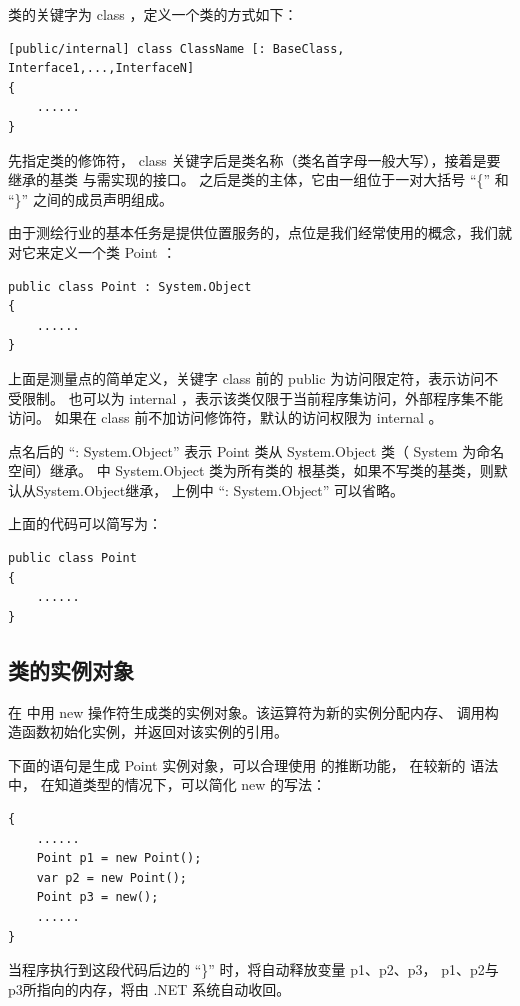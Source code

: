 类的关键字为 class ，定义一个类的方式如下：

\begin{lstlisting}[numbers=none]
[public/internal] class ClassName [: BaseClass, Interface1,...,InterfaceN]
{
    ......
}
\end{lstlisting}

先指定类的修饰符， class 关键字后是类名称（类名首字母一般大写），接着是要继承的基类
与需实现的接口。
之后是类的主体，它由一组位于一对大括号 ``\{'' 和 ``\}'' 之间的成员声明组成。

由于测绘行业的基本任务是提供位置服务的，点位是我们经常使用的概念，我们就对它来定义一个类 Point ：

\begin{lstlisting}[numbers=none]
public class Point : System.Object
{
    ......
}
\end{lstlisting}

上面是测量点的简单定义，关键字 class 前的 public 为访问限定符，表示访问不受限制。
也可以为 internal ，表示该类仅限于当前程序集访问，外部程序集不能访问。
如果在 class 前不加访问修饰符，默认的访问权限为 internal 。

点名后的 ``: System.Object'' 表示 Point 类从 System.Object 类（ System 为命名空间）继承。
\cs 中 System.Object 类为所有类的 根基类，如果不写类的基类，则默认从System.Object继承，
上例中 ``: System.Object'' 可以省略。

上面的代码可以简写为：
\begin{lstlisting}[numbers=none]
public class Point
{
    ......
}
\end{lstlisting}

\subsection{类的实例对象}

在 \cs 中用 new 操作符生成类的实例对象。该运算符为新的实例分配内存、
调用构造函数初始化实例，并返回对该实例的引用。

下面的语句是生成 Point 实例对象，可以合理使用 \cs 的推断功能，
在较新的 \cs 语法中， 在知道类型的情况下，可以简化 new 的写法：

\begin{lstlisting}
{
    ......
    Point p1 = new Point();
    var p2 = new Point();
    Point p3 = new();
    ......
}
\end{lstlisting}

当程序执行到这段代码后边的 ``\}'' 时，将自动释放变量 p1、p2、p3，
p1、p2与p3所指向的内存，将由 .NET 系统自动收回。

